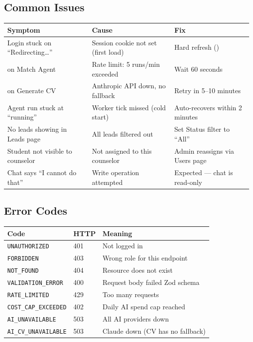 \documentclass[11pt, a4paper]{article}
\newcommand{\key}[1]{\fbox{\small\texttt{#1}}}
\begin{document}
\subsection{Common Issues}

\begin{center}
\begin{tabularx}{\linewidth}{lXl}
  \toprule
  \textbf{Symptom} & \textbf{Cause} & \textbf{Fix} \\
  \midrule
  Login stuck on ``Redirecting\ldots'' &
    Session cookie not set (first load) &
    Hard refresh (\key{Ctrl+Shift+R}) \\
  \addlinespace
  429 on Match Agent &
    Rate limit: 5 runs/min exceeded &
    Wait 60 seconds \\
  \addlinespace
  503 on Generate CV &
    Anthropic API down, no fallback &
    Retry in 5--10 minutes \\
  \addlinespace
  Agent run stuck at ``running'' &
    Worker tick missed (cold start) &
    Auto-recovers within 2 minutes \\
  \addlinespace
  No leads showing in Leads page &
    All leads filtered out &
    Set Status filter to ``All'' \\
  \addlinespace
  Student not visible to counselor &
    Not assigned to this counselor &
    Admin reassigns via Users page \\
  \addlinespace
  Chat says ``I cannot do that'' &
    Write operation attempted &
    Expected — chat is read-only \\
  \bottomrule
\end{tabularx}
\end{center}

\subsection{Error Codes}

\begin{center}
\begin{tabular}{lll}
  \toprule
  \textbf{Code} & \textbf{HTTP} & \textbf{Meaning} \\
  \midrule
  \texttt{UNAUTHORIZED}        & 401 & Not logged in \\
  \texttt{FORBIDDEN}           & 403 & Wrong role for this endpoint \\
  \texttt{NOT\_FOUND}          & 404 & Resource does not exist \\
  \texttt{VALIDATION\_ERROR}   & 400 & Request body failed Zod schema \\
  \texttt{RATE\_LIMITED}       & 429 & Too many requests \\
  \texttt{COST\_CAP\_EXCEEDED} & 402 & Daily AI spend cap reached \\
  \texttt{AI\_UNAVAILABLE}     & 503 & All AI providers down \\
  \texttt{AI\_CV\_UNAVAILABLE} & 503 & Claude down (CV has no fallback) \\
  \bottomrule
\end{tabular}
\end{center}
\end{document}
